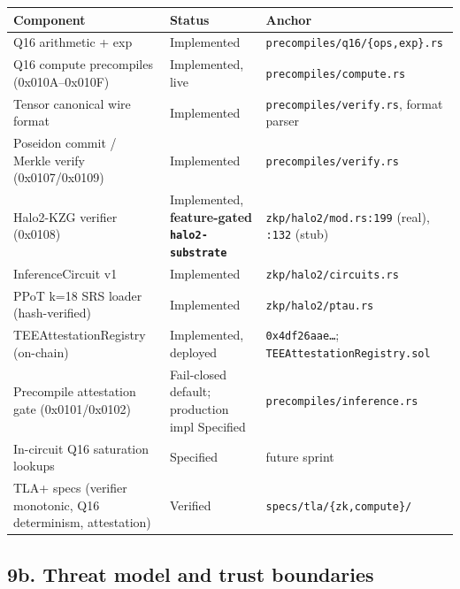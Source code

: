 {\def\LTcaptype{none} %
\begin{longtable}[]{@{}
  >{\raggedright\arraybackslash}p{}
  >{\raggedright\arraybackslash}p{}
  >{\raggedright\arraybackslash}p{}@{}}
\toprule\noalign{}
\begin{minipage}[b]{\linewidth}\raggedright
Component
\end{minipage} & \begin{minipage}[b]{\linewidth}\raggedright
Status
\end{minipage} & \begin{minipage}[b]{\linewidth}\raggedright
Anchor
\end{minipage} \\
\midrule\noalign{}
\endhead
\bottomrule\noalign{}
\endlastfoot
Q16 arithmetic + exp & Implemented &
\texttt{precompiles/q16/\{ops,exp\}.rs} \\
6 Q16 compute precompiles (0x010A--0x010F) & Implemented, live &
\texttt{precompiles/compute.rs} \\
Tensor canonical wire format & Implemented &
\texttt{precompiles/verify.rs}, format parser \\
Poseidon commit / Merkle verify (0x0107/0x0109) & Implemented &
\texttt{precompiles/verify.rs} \\
Halo2-KZG verifier (0x0108) & Implemented, \textbf{feature-gated
\texttt{halo2-substrate}} & \texttt{zkp/halo2/mod.rs:199} (real),
\texttt{:132} (stub) \\
InferenceCircuit v1 & Implemented & \texttt{zkp/halo2/circuits.rs} \\
PPoT k=18 SRS loader (hash-verified) & Implemented &
\texttt{zkp/halo2/ptau.rs} \\
TEEAttestationRegistry (on-chain) & Implemented, deployed &
\texttt{0x4df26aae…}; \texttt{TEEAttestationRegistry.sol} \\
Precompile attestation gate (0x0101/0x0102) & Fail-closed default;
production impl Specified & \texttt{precompiles/inference.rs} \\
In-circuit Q16 saturation lookups & Specified & future sprint \\
TLA+ specs (verifier monotonic, Q16 determinism, attestation) & Verified
& \texttt{specs/tla/\{zk,compute\}/} \\
\end{longtable}
}

\subsection{9b. Threat model and trust
boundaries}\label{b.-threat-model-and-trust-boundaries}

